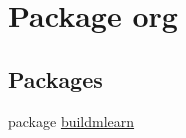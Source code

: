 \hypertarget{namespaceorg}{\section{Package org}
\label{namespaceorg}
}
\subsection*{Packages}
\begin{DoxyCompactItemize}
\item 
package \hyperlink{namespaceorg_1_1buildmlearn}{buildmlearn}
\end{DoxyCompactItemize}
